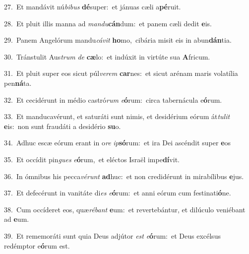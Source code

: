 {\numbfont\textcolor{\numbcolor}{27.}}~Et mandávit nú\-\textit{bi}\-\textit{bus} \textbf{dé}\-super:~\star et jánuas cæli a\-\textbf{pé}\-ruit.\par
{\numbfont\textcolor{\numbcolor}{28.}}~Et pluit illis manna ad \textit{man}\-\textit{du}\textbf{cán}dum:~\star et panem cæli dedit \textbf{e}\-is.\par
{\numbfont\textcolor{\numbcolor}{29.}}~Panem Angelórum mandu\-\textit{cá}\-\textit{vit} \textbf{ho}\-mo,~\star cibária misit eis in abun\-\textbf{dán}\-tia.\par
{\numbfont\textcolor{\numbcolor}{30.}}~Tránstulit Aus\textit{trum} \textit{de} \textbf{cæ}\-lo:~\star et indúxit in virtúte sua \textbf{A}\-fricum.\par
{\numbfont\textcolor{\numbcolor}{31.}}~Et pluit super eos sicut púl\-\textit{ve}\-\textit{rem} \textbf{car}\-nes:~\star et sicut arénam maris volatília pen\-\textbf{ná}\-ta.\par
{\numbfont\textcolor{\numbcolor}{32.}}~Et cecidérunt in médio castró\textit{rum} \textit{e}\-\textbf{ó}rum:~\star circa tabernácula e\-\textbf{ó}\-rum.\par
{\numbfont\textcolor{\numbcolor}{33.}}~Et manducavérunt, et saturáti sunt nimis, et desidérium eórum át\-\textit{tu}\-\textit{lit} \textbf{e}\-is:~\star non sunt fraudáti a desidério \textbf{su}\-o.\par
{\numbfont\textcolor{\numbcolor}{34.}}~Adhuc escæ eórum erant in o\textit{re} \textit{ip}\-\textbf{só}rum:~\star et ira Dei ascéndit super \textbf{e}\-os\par
{\numbfont\textcolor{\numbcolor}{35.}}~Et occídit pin\textit{gues} \textit{e}\-\textbf{ó}rum,~\star et eléctos Israël impe\-\textbf{dí}\-vit.\par
{\numbfont\textcolor{\numbcolor}{36.}}~In ómnibus his pecca\-\textit{vé}\-\textit{runt} \textbf{ad}\-huc:~\star et non credidérunt in mirabílibus \textbf{e}\-jus.\par
{\numbfont\textcolor{\numbcolor}{37.}}~Et defecérunt in vanitáte di\textit{es} \textit{e}\-\textbf{ó}rum:~\star et anni eórum cum festinati\-\textbf{ó}\-ne.\par
{\numbfont\textcolor{\numbcolor}{38.}}~Cum occíderet eos, quæ\-\textit{ré}\-\textit{bant} \textbf{e}\-um:~\star et revertebántur, et dilúculo veniébant ad \textbf{e}\-um.\par
{\numbfont\textcolor{\numbcolor}{39.}}~Et rememoráti sunt quia Deus adjútor \textit{est} \textit{e}\-\textbf{ó}rum:~\star et Deus excélsus redémptor e\-\textbf{ó}\-rum est.\par
